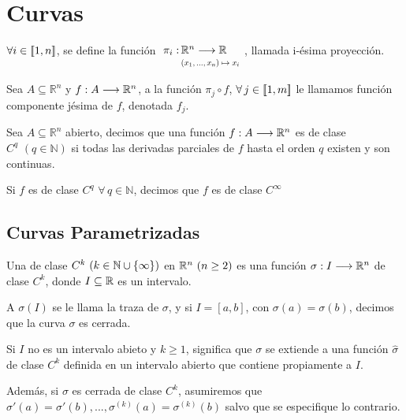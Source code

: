 \section{Curvas}

\begin{dfn}
	$\forall i \in [\![1,n]\!]$, se define la función $ \rfunc{\pi_i}{\mathbb{R}^n}{\mathbb{R}}{(x_1, ..., x_n)}{x_i}$, llamada i-ésima proyección.
\end{dfn}

\begin{dfn}
	Sea $A \subseteq \mathbb{R}^ n $ y $f: A \longrightarrow \mathbb{R}^n$, a la función $\pi_j \circ f$, $\forall \, j \in [\![1,m]\!]$ le llamamos función componente jésima de $f$, denotada $f_j$. 
\end{dfn}


\begin{dfn}
	Sea $A \subseteq \mathbb{R}^n$ abierto, decimos que una función $f: A \longrightarrow \mathbb{R}^n$ es de clase $C^q \, \, (q \in \mathbb{N})$ si todas las derivadas parciales de $f$ hasta el orden $q$ existen y son continuas.
	
	Si $f$ es de clase $C^q \, \, \forall \, q \in \mathbb{N}$, decimos que $f$ es de clase $C^{\infty}$
\end{dfn}

\subsection{Curvas Parametrizadas}

\begin{dfn}
	Una  de clase $C^k \, \, (k \in \mathbb{N} \cup \{ \infty \})$ en $\mathbb{R}^n \, \, (n\ge 2)$ es una función $\sigma: I \longrightarrow \mathbb{R}^n$ de clase $C^k$, donde $I \subseteq \mathbb{R}$ es un intervalo.

	A $\sigma (I)$ se le llama la traza de $\sigma$, y si $I=[a,b]$, con $\sigma (a)=\sigma(b)$, decimos que la curva $\sigma$ es cerrada. 
\end{dfn}


\begin{obs}

	Si $I$ no es un intervalo abieto y $k \ge 1$, significa que $\sigma$ se extiende a una función $\hat{\sigma}$ de clase $C^k $ definida en un intervalo abierto que contiene propiamente a $I$.

	Además, si $\sigma$ es cerrada de clase $C^k$, asumiremos que $\sigma' (a)= \sigma' (b), ..., \sigma ^{(k)} (a)= \sigma ^{(k)} (b)$ salvo que se especifique lo contrario.

\end{obs}

